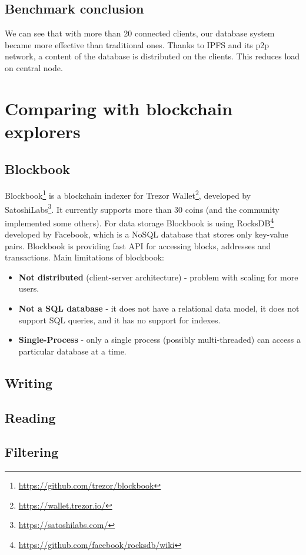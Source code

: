 \subsection{Benchmark conclusion}
We can see that with more than 20 connected clients, our database system became more effective than traditional ones. Thanks to IPFS and its p2p network, a content of the database is distributed on the clients. This reduces load on central node.

\section{Comparing with blockchain explorers}


\subsection{Blockbook}
Blockbook\footnote{\url{https://github.com/trezor/blockbook}} is a blockchain indexer for Trezor Wallet\footnote{\url{https://wallet.trezor.io/}}, developed by SatoshiLabs\footnote{\url{https://satoshilabs.com/}}. It currently supports more than 30 coins (and the community implemented some others). For data storage Blockbook is using RocksDB\footnote{\url{https://github.com/facebook/rocksdb/wiki}} developed by Facebook, which is a NoSQL database that stores only key-value pairs. Blockbook is providing fast API for accessing blocks, addresses and transactions. Main limitations of blockbook:
\begin{itemize}
    \item \textbf{Not distributed} (client-server architecture) - problem with scaling for more users. 
    \item \textbf{Not a SQL database} - it does not have a relational data model, it does not support SQL queries, and it has no support for indexes.
    \item \textbf{Single-Process} - only a single process (possibly multi-threaded) can access a particular database at a time.
\end{itemize}

\subsection{Writing}

\subsection{Reading}


\subsection{Filtering}